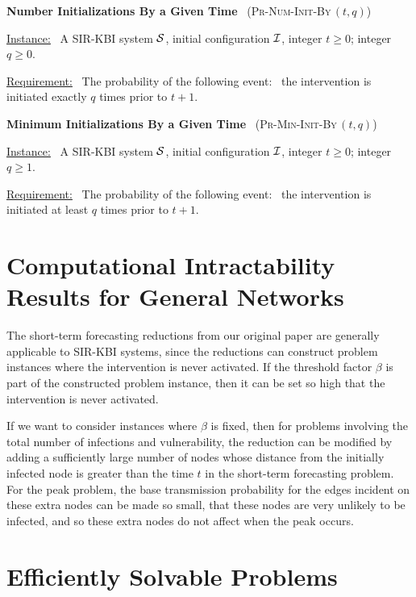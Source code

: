 \documentclass[11pt]{article}
\newcommand{\cali}{\mbox{${\cal I}$}}
\newcommand{\cals}{\mbox{${\cal S}$}}
\newcommand{\NumInitsBy}{\mbox{\textsc{Pr-Num-Init-By}$\,(t,q)$}}
\newcommand{\MinInitsBy}{\mbox{\textsc{Pr-Min-Init-By}$\,(t,q)$}}
\begin{document}
\bigskip
\noindent
\textbf{Number Initializations By a Given Time}~ (\NumInitsBy)

\medskip
\noindent
\underline{Instance:}~ A SIR-KBI system \cals,
initial configuration \cali, integer $t \geq 0$; integer $q \geq 0$.

\smallskip
\noindent
\underline{Requirement:}~ The probability of the following
event:~ the intervention is initiated exactly $q$ times prior to $t+1$.


\bigskip
\noindent
\textbf{Minimum Initializations By a Given Time}~ (\MinInitsBy)

\medskip
\noindent
\underline{Instance:}~ A SIR-KBI system \cals,
initial configuration \cali, integer $t \geq 0$; integer $q \geq 1$.

\smallskip
\noindent
\underline{Requirement:}~ The probability of the following
event:~ the intervention is initiated at least $q$ times prior to $t+1$.









\bigskip

\section{Computational Intractability Results for General Networks}
\label{sec:general_results}

The short-term forecasting reductions from our original paper 
are generally applicable to SIR-KBI systems,
since the reductions can construct problem instances where the intervention is never activated.
If the threshold factor $\beta$ is part of the constructed problem instance,
then it can be set so high that the intervention is never activated.

If we want to consider instances where $\beta$ is fixed,
then for problems involving the total number of infections and vulnerability,
the reduction can be modified by adding a sufficiently large number of nodes 
whose distance from the initially infected node is greater than the time $t$
in the short-term forecasting problem.
For the peak problem, 
the base transmission probability for the edges incident on these extra nodes can be made so small, 
that these nodes are very unlikely to be infected, 
and so these extra nodes do not affect when the peak occurs. 



\bigskip

\section{Efficiently Solvable Problems}
\label{sec:efficiently_solvable}
\end{document}
